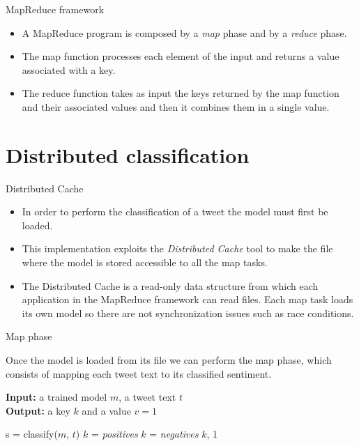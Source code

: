 \documentclass{beamer}
\begin{document}
\begin{frame}{MapReduce framework}

\begin{itemize}
\item
A MapReduce program is composed by a \textit{map} phase and by a \textit{reduce} phase.
\item
The map function processes each element of the input and returns a value associated with a key.
\item
The reduce function takes as input the keys returned by the map function and their associated values and then it combines them in a single value.
\end{itemize}

\end{frame}


\section{Distributed classification}


\begin{frame}{Distributed Cache}

\begin{itemize}
\item
In order to perform the classification of a tweet the model must first be loaded.
\item
This implementation exploits the \textit{Distributed Cache} tool to make the file where the model is stored accessible to all the map tasks.
\item
The Distributed Cache is a read-only data structure from which each application in the MapReduce framework can read files. Each map task loads its own model so there are not synchronization issues such as race conditions.
\end{itemize}

\end{frame}


\begin{frame}{Map phase}

Once the model is loaded from its file we can perform the map phase, which consists of mapping each tweet text to its classified sentiment.

\begin{algorithm}[H]
\caption{Map function}
\textbf{Input:} a trained model $m$, a tweet text $t$ \\
\textbf{Output:} a key $k$ and a value $v = 1$ \\
\begin{algorithmic}
    \State s = classify($m$, $t$)
        \State $k$ = \textit{positives}
    \Else
        \State $k$ = \textit{negatives}
    \EndIf
    \State \Return $k$, 1

\end{algorithmic}
\end{algorithm}

\end{frame}
\end{document}
